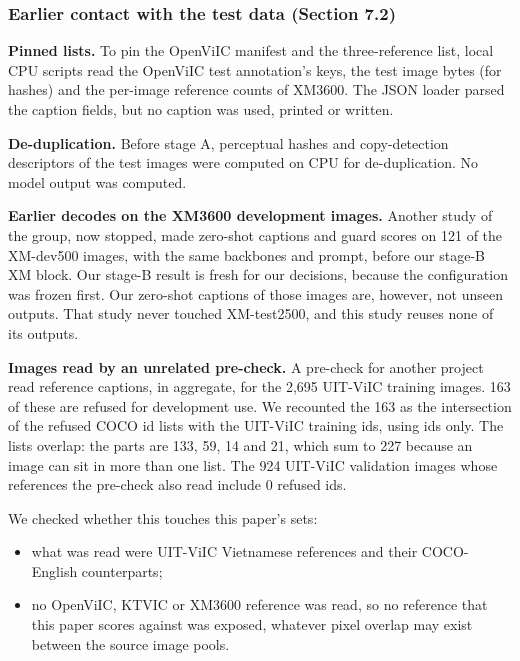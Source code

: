 \subsubsection{Earlier contact with the test data (Section
7.2)}\label{earlier-contact-with-the-test-data-section-7.2}

\textbf{Pinned lists.} To pin the OpenViIC manifest and the three-reference list, local CPU scripts
read the OpenViIC test annotation's keys, the test image bytes (for hashes) and the per-image
reference counts of XM3600. The JSON loader parsed the caption fields, but no caption was used,
printed or written.

\textbf{De-duplication.} Before stage A, perceptual hashes and copy-detection descriptors of the
test images were computed on CPU for de-duplication. No model output was computed.

\textbf{Earlier decodes on the XM3600 development images.} Another study of the group, now stopped,
made zero-shot captions and guard scores on 121 of the XM-dev500 images, with the same backbones and
prompt, before our stage-B XM block. Our stage-B result is fresh for our decisions, because the
configuration was frozen first. Our zero-shot captions of those images are, however, not unseen
outputs. That study never touched XM-test2500, and this study reuses none of its outputs.

\textbf{Images read by an unrelated pre-check.} A pre-check for another project read reference
captions, in aggregate, for the 2,695 UIT-ViIC training images. 163 of these are refused for
development use. We recounted the 163 as the intersection of the refused COCO id lists with the
UIT-ViIC training ids, using ids only. The lists overlap: the parts are 133, 59, 14 and 21, which
sum to 227 because an image can sit in more than one list. The 924 UIT-ViIC validation images whose
references the pre-check also read include 0 refused ids.

We checked whether this touches this paper's sets:

\begin{itemize}
\tightlist
\item
  what was read were UIT-ViIC Vietnamese references and their COCO-English counterparts;
\item
  no OpenViIC, KTVIC or XM3600 reference was read, so no reference that this paper scores against
  was exposed, whatever pixel overlap may exist between the source image pools.
\end{itemize}

